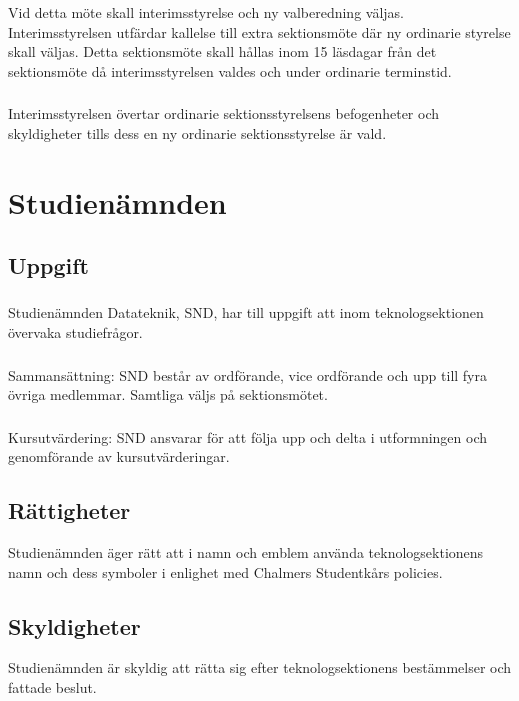 \documentclass[a4paper, 10pt]{article}
\begin{document}
\subsubsection{}
Vid detta möte skall interimsstyrelse och ny valberedning väljas. Interimsstyrelsen utfärdar kallelse till extra sektionsmöte där ny ordinarie styrelse skall väljas. Detta sektionsmöte skall hållas inom 15 läsdagar från det sektionsmöte då interimsstyrelsen valdes och under ordinarie terminstid.
\subsubsection{}
Interimsstyrelsen övertar ordinarie sektionsstyrelsens befogenheter och skyldigheter tills dess en ny ordinarie sektionsstyrelse är vald.
\newpage

\section{Studienämnden}
\subsection{Uppgift}
\subsubsection{}
Studienämnden Datateknik, SND, har till uppgift att inom teknologsektionen övervaka studiefrågor.
\subsubsection{}
Sammansättning: SND består av ordförande, vice ordförande och upp till fyra övriga medlemmar. Samtliga väljs på sektionsmötet.
\subsubsection{}
Kursutvärdering: SND ansvarar för att följa upp och delta i utformningen och genomförande av kursutvärderingar.
\subsection{Rättigheter}
Studienämnden äger rätt att i namn och emblem använda teknologsektionens namn och dess symboler i enlighet med Chalmers Studentkårs policies.
\subsection{Skyldigheter}
Studienämnden är skyldig att rätta sig efter teknologsektionens bestämmelser och fattade beslut.
\newpage
\end{document}
